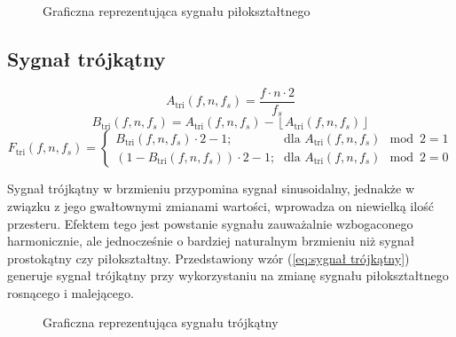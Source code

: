 \begin{figure}[H]
    \centering
    \scalebox{1.0}{}
    \caption{Graficzna reprezentująca sygnału piłokształtnego}
    \label{fig:Graficzna reprezentująca sygnału piłokształtnego}
\end{figure}


\subsection{Sygnał trójkątny}
\newcommand{\Ftriangle}{F_{\text{tri}}}
\newcommand{\Atriangle}{A_{\text{tri}}}
\newcommand{\Btriangle}{B_{\text{tri}}}

\begin{equation}
    \Atriangle(f, n, f_s) = \frac{f \cdot n \cdot 2}{f_s}
    \label{eq:sygnał trójkątny a}
\end{equation}
\begin{equation}
    \Btriangle(f, n, f_s) = \Atriangle(f, n, f_s) - \left\lfloor \Atriangle(f, n, f_s) \right\rfloor
    \label{eq:sygnał trójkątny b}
\end{equation}
\begin{equation}
    \Ftriangle(f, n, f_s) = \left\{
    \begin{array}{ll}
        \Btriangle(f, n, f_s) \cdot 2 - 1 \text{;} & \text{dla } \Atriangle(f, n, f_s) \mod 2 = 1 \\
        (1 - \Btriangle(f, n, f_s)) \cdot 2 - 1 \text{;} & \text{dla } \Atriangle(f, n, f_s) \mod 2 = 0
    \end{array}
    \right.
    \label{eq:sygnał trójkątny}
\end{equation}

Sygnał trójkątny w brzmieniu przypomina sygnał sinusoidalny, jednakże w związku z jego gwałtownymi zmianami wartości, wprowadza on niewielką ilość przesteru. Efektem tego jest powstanie sygnału zauważalnie wzbogaconego harmonicznie, ale jednocześnie o bardziej naturalnym brzmieniu niż sygnał prostokątny czy piłokształtny. Przedstawiony wzór (\ref{eq:sygnał trójkątny}) generuje sygnał trójkątny przy wykorzystaniu na zmianę sygnału piłokształtnego rosnącego i malejącego.

\begin{figure}[H]
    \centering
    \scalebox{1.0}{}
    \caption{Graficzna reprezentująca sygnału trójkątny}
    \label{fig:Graficzna reprezentująca sygnału trójkątny}
\end{figure}


